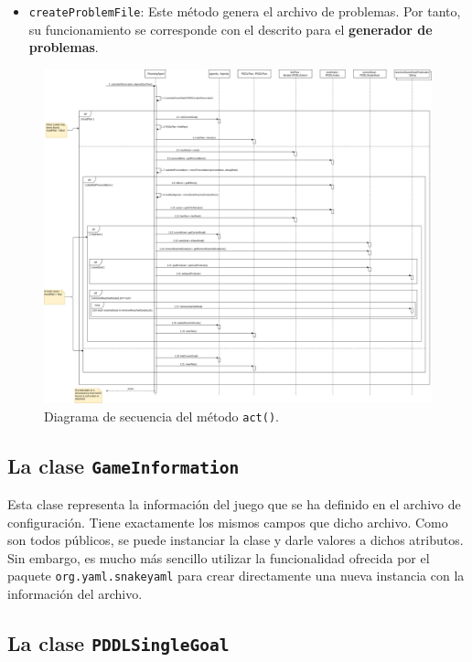 \begin{itemize}[label=\textbullet]
    \item \texttt{createProblemFile}: Este método genera el archivo de problemas. Por tanto, su
    funcionamiento se corresponde con el descrito para el \textbf{generador de problemas}.
\end{itemize}

\begin{figure}[H]
    \centering
    \includegraphics[width=\textwidth, height=0.9\textheight]{img/CH07/sequence_diagram.png}
    \caption{Diagrama de secuencia del método \texttt{act()}.}
    \label{fig:sequence_diagram}
\end{figure}

\subsection{La clase \texttt{GameInformation}}

Esta clase representa la información del juego que se ha definido en el archivo de configuración.
Tiene exactamente los mismos campos que dicho archivo. Como son todos públicos, se puede instanciar
la clase y darle valores a dichos atributos. Sin embargo, es mucho más sencillo utilizar la funcionalidad
ofrecida por el paquete \texttt{org.yaml.snakeyaml} para crear directamente una nueva instancia con
la información del archivo.

\subsection{La clase \texttt{PDDLSingleGoal}}

